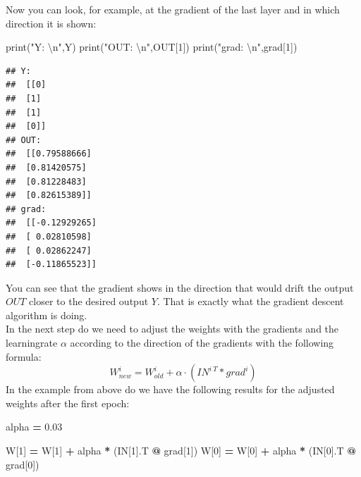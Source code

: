 \documentclass[
]{book}
\newenvironment{Shaded}{\begin{snugshade}}{\end{snugshade}}
\newcommand{\BuiltInTok}[1]{#1}
\newcommand{\CharTok}[1]{\textcolor[rgb]{0.31,0.60,0.02}{#1}}
\newcommand{\DecValTok}[1]{\textcolor[rgb]{0.00,0.00,0.81}{#1}}
\newcommand{\FloatTok}[1]{\textcolor[rgb]{0.00,0.00,0.81}{#1}}
\newcommand{\NormalTok}[1]{#1}
\newcommand{\OperatorTok}[1]{\textcolor[rgb]{0.81,0.36,0.00}{\textbf{#1}}}
\newcommand{\StringTok}[1]{\textcolor[rgb]{0.31,0.60,0.02}{#1}}
\begin{document}
Now you can look, for example, at the gradient of the last layer and in which direction it is shown:

\begin{Shaded}
\begin{Highlighting}[]
\BuiltInTok{print}\NormalTok{(}\StringTok{"Y: }\CharTok{\textbackslash{}n}\StringTok{"}\NormalTok{,Y)}
\BuiltInTok{print}\NormalTok{(}\StringTok{"OUT: }\CharTok{\textbackslash{}n}\StringTok{"}\NormalTok{,OUT[}\DecValTok{1}\NormalTok{])}
\BuiltInTok{print}\NormalTok{(}\StringTok{"grad: }\CharTok{\textbackslash{}n}\StringTok{"}\NormalTok{,grad[}\DecValTok{1}\NormalTok{])}
\end{Highlighting}
\end{Shaded}

\begin{verbatim}
## Y: 
##  [[0]
##  [1]
##  [1]
##  [0]]
## OUT: 
##  [[0.79588666]
##  [0.81420575]
##  [0.81228483]
##  [0.82615389]]
## grad: 
##  [[-0.12929265]
##  [ 0.02810598]
##  [ 0.02862247]
##  [-0.11865523]]
\end{verbatim}

You can see that the gradient shows in the direction that would drift the output \(OUT\) closer to the desired output \(Y\). That is exactly what the gradient descent algorithm is doing.\\
In the next step do we need to adjust the weights with the gradients and the learningrate \(\alpha\) according to the direction of the gradients with the following formula:
\[
  W^i_{new} = W^i_{old} + \alpha \cdot ( IN^{i\ T} * grad^i) 
\]
In the example from above do we have the following results for the adjusted weights after the first epoch:

\begin{Shaded}
\begin{Highlighting}[]
\NormalTok{alpha }\OperatorTok{=} \FloatTok{0.03}

\NormalTok{W[}\DecValTok{1}\NormalTok{] }\OperatorTok{=}\NormalTok{ W[}\DecValTok{1}\NormalTok{] }\OperatorTok{+}\NormalTok{ alpha }\OperatorTok{*}\NormalTok{ (IN[}\DecValTok{1}\NormalTok{].T }\OperatorTok{@}\NormalTok{ grad[}\DecValTok{1}\NormalTok{]) }
\NormalTok{W[}\DecValTok{0}\NormalTok{] }\OperatorTok{=}\NormalTok{ W[}\DecValTok{0}\NormalTok{] }\OperatorTok{+}\NormalTok{ alpha }\OperatorTok{*}\NormalTok{ (IN[}\DecValTok{0}\NormalTok{].T }\OperatorTok{@}\NormalTok{ grad[}\DecValTok{0}\NormalTok{]) }
\end{Highlighting}
\end{Shaded}
\end{document}
